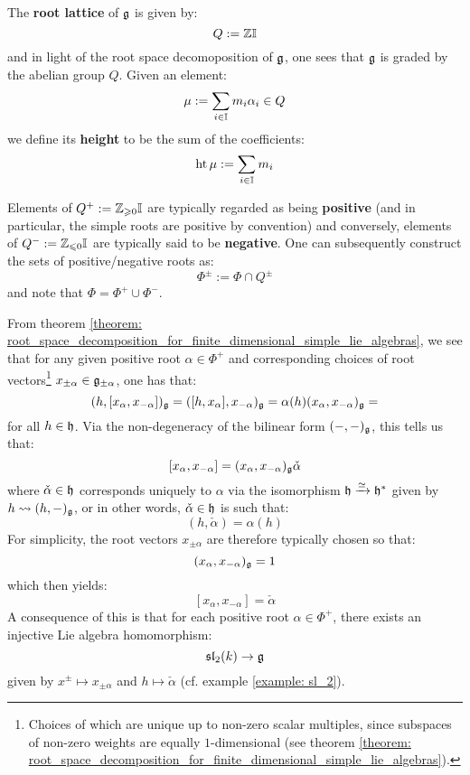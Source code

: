         The \textbf{root lattice} of $\mathfrak{g}$ is given by:
            $$Q := \mathbb{Z} \mathbb{I}$$
        and in light of the root space decomoposition of $\mathfrak{g}$, one sees that $\mathfrak{g}$ is graded by the abelian group $Q$. Given an element:
            $$\mu := \sum_{i \in \mathbb{I}} m_i \alpha_i \in Q$$
        we define its \textbf{height} to be the sum of the coefficients:
            $$\operatorname{ht} \mu := \sum_{i \in \mathbb{I}} m_i$$

        Elements of $Q^+ := \mathbb{Z}_{\geqslant 0} \mathbb{I}$ are typically regarded as being \textbf{positive} (and in particular, the simple roots are positive by convention) and conversely, elements of $Q^- := \mathbb{Z}_{\leqslant 0} \mathbb{I}$ are typically said to be \textbf{negative}. One can subsequently construct the sets of positive/negative roots as:
            $$\Phi^{\pm} := \Phi \cap Q^{\pm}$$
        and note that $\Phi = \Phi^+ \cup \Phi^-$.

        From theorem \ref{theorem: root_space_decomposition_for_finite_dimensional_simple_lie_algebras}, we see that for any given positive root $\alpha \in \Phi^+$ and corresponding choices of root vectors\footnote{Choices of which are unique up to non-zero scalar multiples, since subspaces of non-zero weights are equally $1$-dimensional (see theorem \ref{theorem: root_space_decomposition_for_finite_dimensional_simple_lie_algebras}).} $x_{\pm\alpha} \in \mathfrak{g}_{\pm\alpha}$, one has that:
            $$(h, [x_{\alpha}, x_{-\alpha}])_{\mathfrak{g}} = ([h, x_{\alpha}], x_{-\alpha})_{\mathfrak{g}} = \alpha(h) (x_{\alpha}, x_{-\alpha})_{\mathfrak{g}} = $$
        for all $h \in \mathfrak{h}$. Via the non-degeneracy of the bilinear form $(-, -)_{\mathfrak{g}}$, this tells us that:
            $$[x_{\alpha}, x_{-\alpha}] = (x_{\alpha}, x_{-\alpha})_{\mathfrak{g}} \check{\alpha}$$
        where $\check{\alpha} \in \mathfrak{h}$ corresponds uniquely to $\alpha$ via the isomorphism $\mathfrak{h} \xrightarrow[]{\simeq} \mathfrak{h}^*$ given by $h \leadsto (h, -)_{\mathfrak{g}}$, or in other words, $\check{\alpha} \in \mathfrak{h}$ is such that:
            $$(h, \check{\alpha}) = \alpha(h)$$
        For simplicity, the root vectors $x_{\pm \alpha}$ are therefore typically chosen so that:
            $$(x_{\alpha}, x_{-\alpha})_{\mathfrak{g}} = 1$$
        which then yields:
            $$[x_{\alpha}, x_{-\alpha}] = \check{\alpha}$$
        A consequence of this is that for each positive root $\alpha \in \Phi^+$, there exists an injective Lie algebra homomorphism:
            $$\mathfrak{sl}_2(k) \to \mathfrak{g}$$
        given by $x^{\pm} \mapsto x_{\pm \alpha}$ and $h \mapsto \check{\alpha}$ (cf. example \ref{example: sl_2}).
        

